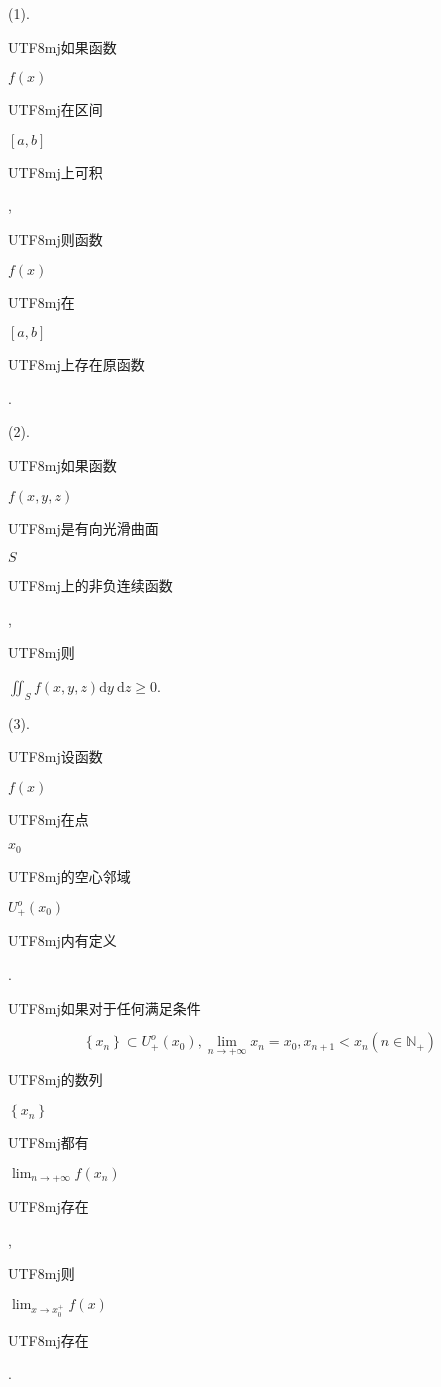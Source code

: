 \documentclass[10pt]{article}
\begin{document}
(1). \begin{CJK}{UTF8}{mj}如果函数\end{CJK} $f(x)$ \begin{CJK}{UTF8}{mj}在区间\end{CJK} $[a, b]$ \begin{CJK}{UTF8}{mj}上可积\end{CJK}, \begin{CJK}{UTF8}{mj}则函数\end{CJK} $f(x)$ \begin{CJK}{UTF8}{mj}在\end{CJK} $[a, b]$ \begin{CJK}{UTF8}{mj}上存在原函数\end{CJK}.

(2). \begin{CJK}{UTF8}{mj}如果函数\end{CJK} $f(x, y, z)$ \begin{CJK}{UTF8}{mj}是有向光滑曲面\end{CJK} $S$ \begin{CJK}{UTF8}{mj}上的非负连续函数\end{CJK}, \begin{CJK}{UTF8}{mj}则\end{CJK} $\iint_{S} f(x, y, z) \mathrm{d} y \mathrm{~d} z \geqslant 0$.

(3). \begin{CJK}{UTF8}{mj}设函数\end{CJK} $f(x)$ \begin{CJK}{UTF8}{mj}在点\end{CJK} $x_{0}$ \begin{CJK}{UTF8}{mj}的空心邻域\end{CJK} $U_{+}^{o}\left(x_{0}\right)$ \begin{CJK}{UTF8}{mj}内有定义\end{CJK}. \begin{CJK}{UTF8}{mj}如果对于任何满足条件\end{CJK}
$$
\left\{x_{n}\right\} \subset U_{+}^{o}\left(x_{0}\right), \lim _{n \rightarrow+\infty} x_{n}=x_{0}, x_{n+1}<x_{n}\left(n \in \mathbb{N}_{+}\right)
$$
\begin{CJK}{UTF8}{mj}的数列\end{CJK} $\left\{x_{n}\right\}$ \begin{CJK}{UTF8}{mj}都有\end{CJK} $\lim _{n \rightarrow+\infty} f\left(x_{n}\right)$ \begin{CJK}{UTF8}{mj}存在\end{CJK}, \begin{CJK}{UTF8}{mj}则\end{CJK} $\lim _{x \rightarrow x_{0}^{+}} f(x)$ \begin{CJK}{UTF8}{mj}存在\end{CJK}.
\end{document}
